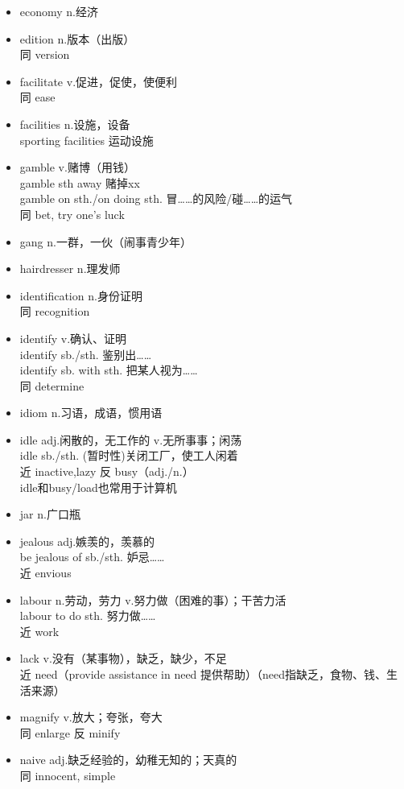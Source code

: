 \begin{multicols}{2}
\begin{itemize}
    \item economy n.经济
    \item edition n.版本（出版）\\同 version
    \item facilitate v.促进，促使，使便利\\同 ease
    \item facilities n.设施，设备\\sporting facilities 运动设施
    \item gamble v.赌博（用钱）\\gamble sth away 赌掉xx\\gamble on sth./on doing sth. 冒……的风险/碰……的运气\\同 bet, try one's luck
    \item gang n.一群，一伙（闹事青少年）
    \item hairdresser n.理发师
    \item identification n.身份证明\\同 recognition
    \item identify v.确认、证明\\identify sb./sth. 鉴别出……\\identify sb. with sth. 把某人视为……\\同 determine
    \item idiom n.习语，成语，惯用语
    \item idle adj.闲散的，无工作的 v.无所事事；闲荡\\idle sb./sth. (暂时性)关闭工厂，使工人闲着\\近 inactive,lazy 反 busy（adj./n.）\\idle和busy/load也常用于计算机
    \item jar n.广口瓶
    \item jealous adj.嫉羡的，羡慕的\\be jealous of sb./sth. 妒忌……\\近 envious
    \item labour n.劳动，劳力 v.努力做（困难的事）；干苦力活\\labour to do sth. 努力做……\\近 work
    \item lack v.没有（某事物），缺乏，缺少，不足\\近 need（provide assistance in need 提供帮助）（need指缺乏，食物、钱、生活来源）
    \item magnify v.放大；夸张，夸大\\同 enlarge 反 minify
    \item naive adj.缺乏经验的，幼稚无知的；天真的\\同 innocent, simple

\end{itemize}
\end{multicols}
